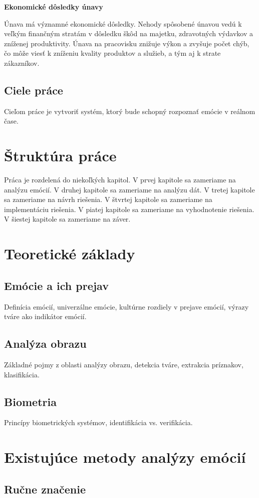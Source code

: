 \textbf{Ekonomické dôsledky únavy}

Únava má významné ekonomické dôsledky. Nehody spôsobené únavou vedú k veľkým finančným stratám v dôsledku škôd na majetku, zdravotných výdavkov a zníženej produktivity. Únava na pracovisku znižuje výkon a zvyšuje počet chýb, čo môže viesť k zníženiu kvality produktov a služieb, a tým aj k strate zákazníkov.
\subsection{Ciele práce}
Cieľom práce je vytvoriť systém, ktorý bude schopný rozpoznať emócie v reálnom čase.

\section{Štruktúra práce}
Práca je rozdelená do niekoľkých kapitol. V prvej kapitole sa zameriame na analýzu emócií. V druhej kapitole sa zameriame na analýzu dát. V tretej kapitole sa zameriame na návrh riešenia. V štvrtej kapitole sa zameriame na implementáciu riešenia. V piatej kapitole sa zameriame na vyhodnotenie riešenia. V šiestej kapitole sa zameriame na záver.

\section{Teoretické základy}
\subsection{Emócie a ich prejav}
Definícia emócií, univerzálne emócie, kultúrne rozdiely v prejave emócií, výrazy tváre ako indikátor emócií.
\subsection{Analýza obrazu}
Základné pojmy z oblasti analýzy obrazu, detekcia tváre, extrakcia príznakov, klasifikácia.
\subsection{Biometria}
Princípy biometrických systémov, identifikácia vs. verifikácia.

\section{Existujúce metody analýzy emócií}
\subsection{Ručne značenie}
